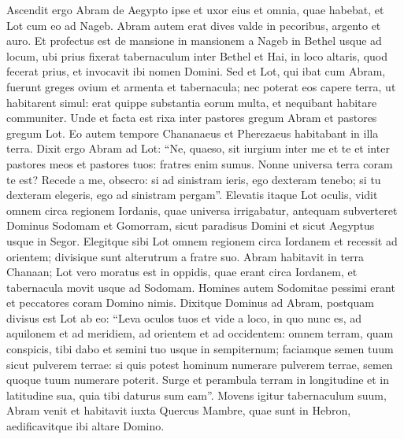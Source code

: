 \begin{biblechapter}
\begin{biblechapter}
\begin{biblechapter}
\begin{biblechapter}
\begin{biblechapter}
\begin{biblechapter}
\begin{biblechapter}
\begin{biblechapter}
\begin{biblechapter}
\begin{biblechapter}
\begin{biblechapter}
\begin{biblechapter}
\begin{biblechapter}
\verse Ascendit ergo Abram de Aegypto ipse et uxor eius et omnia, quae habebat, et Lot cum eo ad Nageb. 
\verse Abram autem erat dives valde in pecoribus, argento et auro. 
\verse Et profectus est de mansione in mansionem a Nageb in Bethel usque ad locum, ubi prius fixerat tabernaculum inter Bethel et Hai, 
\verse in loco altaris, quod fecerat prius, et invocavit ibi nomen Domini.
 \verse Sed et Lot, qui ibat cum Abram, fuerunt greges ovium et armenta et tabernacula; 
\verse nec poterat eos capere terra, ut habitarent simul: erat quippe substantia eorum multa, et nequibant habitare communiter. 
\verse Unde et facta est rixa inter pastores gregum Abram et pastores gregum Lot. Eo autem tempore Chananaeus et Pherezaeus habitabant in illa terra. 
\verse Dixit ergo Abram ad Lot: “Ne, quaeso, sit iurgium inter me et te et inter pastores meos et pastores tuos: fratres enim sumus. 
\verse Nonne universa terra coram te est? Recede a me, obsecro: si ad sinistram ieris, ego dexteram tenebo; si tu dexteram elegeris, ego ad sinistram pergam”.
 \verse Elevatis itaque Lot oculis, vidit omnem circa regionem Iordanis, quae universa irrigabatur, antequam subverteret Dominus Sodomam et Gomorram, sicut paradisus Domini et sicut Aegyptus usque in Segor. 
\verse Elegitque sibi Lot omnem regionem circa Iordanem et recessit ad orientem; divisique sunt alterutrum a fratre suo. 
\verse Abram habitavit in terra Chanaan; Lot vero moratus est in oppidis, quae erant circa Iordanem, et tabernacula movit usque ad Sodomam. 
 \verse Homines autem Sodomitae pessimi erant et peccatores coram Domino nimis.
 \verse Dixitque Dominus ad Abram, postquam divisus est Lot ab eo: “Leva oculos tuos et vide a loco, in quo nunc es, ad aquilonem et ad meridiem, ad orientem et ad occidentem: 
\verse omnem terram, quam conspicis, tibi dabo et semini tuo usque in sempiternum; 
\verse faciamque semen tuum sicut pulverem terrae: si quis potest hominum numerare pulverem terrae, semen quoque tuum numerare poterit. 
 \verse Surge et perambula terram in longitudine et in latitudine sua, quia tibi daturus sum eam”. 
\verse Movens igitur tabernaculum suum, Abram venit et habitavit iuxta Quercus Mambre, quae sunt in Hebron, aedificavitque ibi altare Domino.
 

\end{biblechapter}
\end{biblechapter}
\end{biblechapter}
\end{biblechapter}
\end{biblechapter}
\end{biblechapter}
\end{biblechapter}
\end{biblechapter}
\end{biblechapter}
\end{biblechapter}
\end{biblechapter}
\end{biblechapter}
\end{biblechapter}
